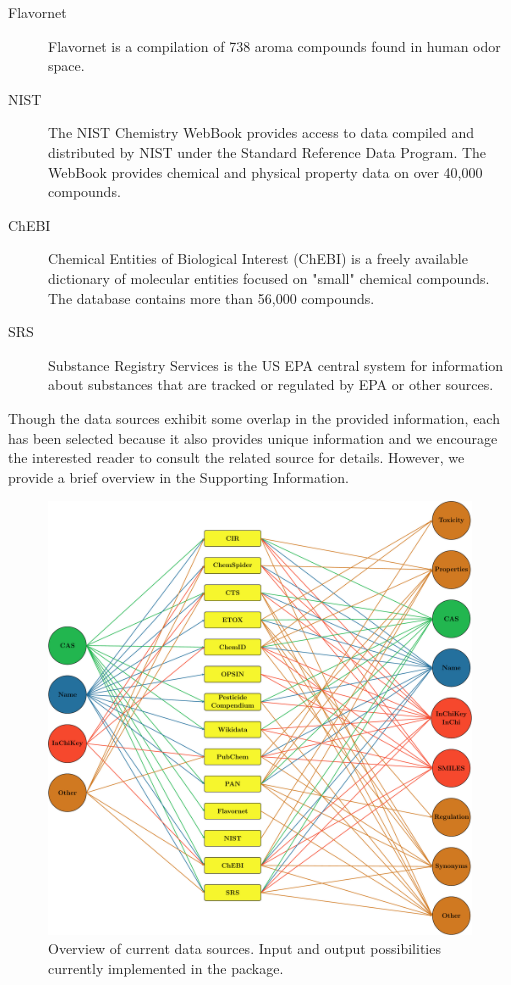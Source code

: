\documentclass[article]{jss}
\begin{document}
\begin{description}
\item[Flavornet]{\citep{flavornet} Flavornet is a compilation of 738 aroma compounds found in human odor space.}
\item[NIST]{\citep{nist} The NIST Chemistry WebBook provides access to data compiled and distributed by NIST under the Standard Reference Data Program. The WebBook provides chemical and physical property data on over 40,000 compounds.}
\item[ChEBI]{\citep{chebi} Chemical Entities of Biological Interest (ChEBI) is a freely available dictionary of molecular entities focused on "small" chemical compounds. The database contains more than 56,000 compounds.}
\item[SRS]{\citep{srs} Substance Registry Services is the US EPA central system for information about substances that are tracked or regulated by EPA or other sources.}

\end{description}

Though the data sources exhibit some overlap in the provided
information, each has been selected because it also provides unique
information and we encourage the interested reader to consult the
related source for details.  However, we provide a brief overview in
the Supporting Information.

\begin{figure}[t!]
  \centering
  \includegraphics{fig1}
  \caption{Overview of current data sources. Input and output possibilities currently implemented in the package.}
  \label{fig:fig1}
\end{figure}
\end{document}
